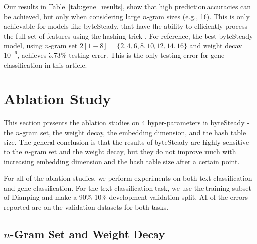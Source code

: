 \documentclass{article}
\begin{document}
Our results in Table~\ref{tab:gene_results}, show that high prediction accuracies can be achieved, but only when considering large $n$-gram sizes (e.g., 16). This is only achievable for models like byteSteady, that have the ability to efficiently process the full set of features using the hashing trick \cite{WDLSA09}. For reference, the best byteSteady model, using \(n\)-gram set \(2[1-8] = \{2,4,6,8,10,12,14,16\}\) and weight decay \(10^{-6}\), achieves 3.73\% testing error. This is the only testing error for gene classification in this article.

\section{Ablation Study}

This section presents the ablation studies on 4 hyper-parameters in byteSteady - the \(n\)-gram set, the weight decay, the embedding dimension, and the hash table size. The general conclusion is that the results of byteSteady are highly sensitive to the \(n\)-gram set and the weight decay, but they do not improve much with increasing embedding dimension and the hash table size after a certain point.

For all of the ablation studies, we perform experiments on both text classification and gene classification. For the text classification task, we use the training subset of Dianping and make a 90\%-10\% development-validation split. All of the errors reported are on the validation datasets for both tasks.

\subsection{\(n\)-Gram Set and Weight Decay}
\end{document}
